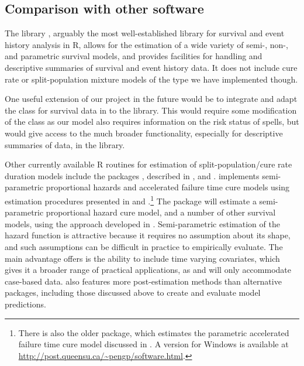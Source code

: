\subsection{Comparison with other software}

The  library \citep{thernau2000modeling, thernau2015survival}, arguably the most well-established library for survival and event history analysis in {\sf R}, allows for the estimation of a wide variety of semi-, non-, and parametric survival models, and provides facilities for handling and descriptive summaries of survival and event history data. It does not include cure rate or split-population mixture models of the type we have implemented though.

One useful extension of our project in the future would be to integrate and adapt the  class for survival data in  to the  library. This would require some modification of the class as our model also requires information on the risk status of spells, but would give access to the much broader functionality, especially for descriptive summaries of data, in the  library. 

Other currently available {\sf R} routines for estimation of split-population/cure rate duration models include the packages   \citep{cai2012smcureR}, described in \citet{cai2012smcure}, and  \citep{garibotti2010nltm}.  implements semi-parametric proportional hazards and accelerated failure time cure models using estimation procedures presented in \citet{peng2003fitting} and \citet{zhang2007new}.\footnote{There is also the older  package, which estimates the parametric accelerated failure time cure model discussed in \citet{peng1998generalized}. A version for Windows is available at \url{http://post.queensu.ca/~pengp/software.html}.} The package  will estimate a semi-parametric proportional hazard cure model, and a number of other survival models, using the approach developed in \citet{tsodikov2003semiparametric,tsodikov2007profile}. Semi-parametric estimation of the hazard function is attractive because it requires no assumption about its shape, and such assumptions can be difficult in practice to empirically evaluate. The main advantage  offers is the ability to include time varying covariates, which gives it a broader range of practical applications, as  and  will only accommodate case-based data.  also features more post-estimation methods than alternative packages, including those discussed above to create and evaluate model predictions.  


